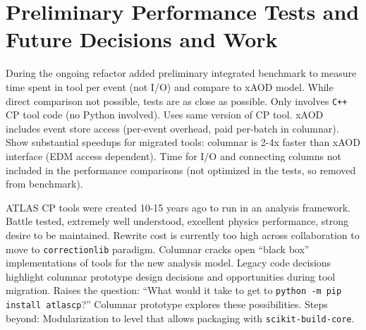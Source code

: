 \section{Preliminary Performance Tests and Future Decisions and Work}\label{sec:conclusions}

During the ongoing refactor added preliminary integrated benchmark to measure time spent in tool per event (not I/O) and compare to xAOD model.
While direct comparison not possible, tests are as close as possible.
Only involves \texttt{C++} CP tool code (no Python involved).
Uses same version of CP tool.
xAOD includes event store access (per-event overhead, paid per-batch in columnar).
Show substantial speedups for migrated tools: columnar is 2-4x faster than xAOD interface (EDM access dependent).
Time for I/O and connecting columns not included in the performance comparisons (not optimized in the tests, so removed from benchmark).

ATLAS CP tools were created 10-15 years ago to run in an analysis framework.
Battle tested, extremely well understood, excellent physics performance, strong desire to be maintained.
Rewrite cost is currently too high across collaboration to move to \texttt{correctionlib} paradigm.
Columnar cracks open ``black box'' implementations of tools for the new analysis model.
Legacy code decisions highlight columnar prototype design decisions and opportunities during tool migration.
Raises the question: ``What would it take to get to \texttt{python -m pip install atlascp}?''
Columnar prototype explores these possibilities.
Steps beyond: Modularization to level that allows packaging with \texttt{scikit-build-core}.
